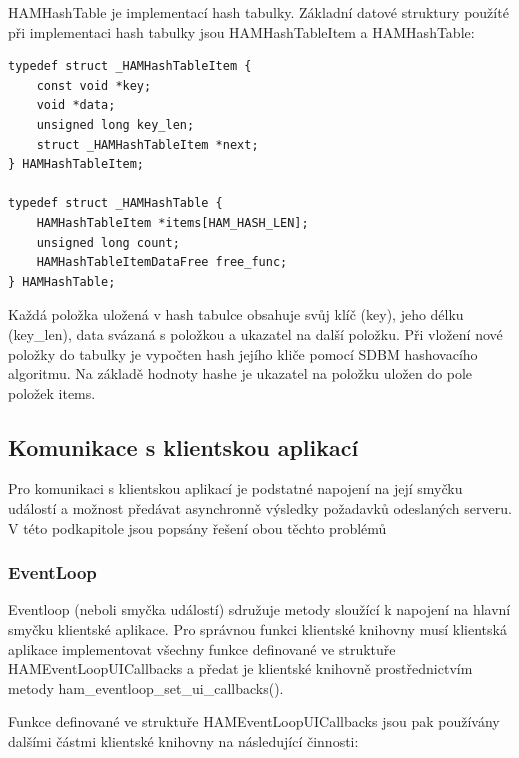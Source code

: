 HAMHashTable je implementací hash tabulky. Základní datové struktury použíté při implementaci hash tabulky jsou
HAMHashTableItem a HAMHashTable:

\begin{verbatim}
typedef struct _HAMHashTableItem {
	const void *key;
	void *data;
	unsigned long key_len;
	struct _HAMHashTableItem *next;
} HAMHashTableItem;

typedef struct _HAMHashTable {
	HAMHashTableItem *items[HAM_HASH_LEN];
	unsigned long count;
	HAMHashTableItemDataFree free_func;
} HAMHashTable;
\end{verbatim}

Každá položka uložená v hash tabulce obsahuje svůj klíč (key), jeho délku (key\_len), data svázaná s položkou a ukazatel
na další položku. Při vložení nové položky do tabulky je vypočten hash jejího kliče pomocí SDBM
hashovacího algoritmu. %
Na základě hodnoty hashe je ukazatel na položku uložen do pole položek items.

\subsection{Komunikace s klientskou aplikací}
\label{implementace_knihovna_komunikace}

Pro komunikaci s klientskou aplikací je podstatné napojení na její smyčku událostí a možnost předávat asynchronně
výsledky požadavků odeslaných serveru. V této podkapitole jsou popsány řešení obou těchto problémů

\subsubsection{EventLoop}

Eventloop (neboli smyčka událostí) sdružuje metody sloužící k napojení na hlavní smyčku
klientské aplikace. Pro správnou funkci klientské
knihovny musí klientská aplikace implementovat všechny funkce definované ve struktuře HAMEventLoopUICallbacks a
předat je klientské knihovně prostřednictvím metody ham\_eventloop\_set\_ui\_callbacks().

Funkce definované ve struktuře HAMEventLoopUICallbacks jsou pak používány dalšími částmi klientské knihovny na
následující činnosti:

